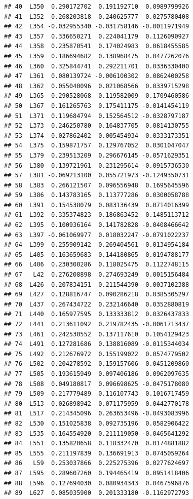 \documentclass[
]{article}
\begin{document}
\begin{verbatim}
## 40  L350  0.290172702  0.191192710  0.0989799926
## 41  L352  0.268203818  0.240625777  0.0275780408
## 42  L354 -0.032955340 -0.031758146 -0.0011971949
## 43  L357  0.336650271  0.224041179  0.1126090927
## 44  L358  0.235870541  0.174024983  0.0618455585
## 45  L359  0.186694682  0.138968475  0.0477262076
## 46  L360  0.325844741  0.292211701  0.0336330400
## 47  L361  0.080139724 -0.006100302  0.0862400258
## 48  L362  0.055040096  0.021068566  0.0339715298
## 49  L365  0.290528068  0.119582009  0.1709460586
## 50  L367  0.161265763  0.175411175 -0.0141454119
## 51  L371  0.119684794  0.152564512 -0.0328797187
## 52  L373  0.246250780  0.164837705  0.0814130755
## 53  L374 -0.027862402  0.005454934 -0.0333173351
## 54  L375  0.159871757  0.129767052  0.0301047047
## 55  L379  0.239513209  0.296676145 -0.0571629351
## 56  L380  0.139721961  0.231295614 -0.0915736530
## 57  L381 -0.069213100  0.055721973 -0.1249350731
## 58  L383  0.266121507  0.096556948  0.1695645596
## 59  L386  0.143783165  0.113777286  0.0300058788
## 60  L391  0.154538079  0.083136439  0.0714016399
## 61  L392  0.335374823  0.186863452  0.1485113712
## 62  L395  0.100936164  0.141782828 -0.0408466642
## 63  L397 -0.061069977  0.018032247 -0.0791022237
## 64  L399  0.255909142  0.269404561 -0.0134954184
## 65  L405  0.163659683  0.144180865  0.0194788177
## 66  L406  0.230300286  0.118025475  0.1122748115
## 67   L42  0.276208898  0.274693249  0.0015156484
## 68  L426  0.207834151  0.211544390 -0.0037102388
## 69  L427  0.128816747  0.090286218  0.0385305297
## 70  L437  0.267434722  0.232146640  0.0352880819
## 71  L440  0.165977595  0.133333812  0.0326437833
## 72  L441  0.213611092  0.219782435 -0.0061713437
## 73  L461  0.242530552  0.137117610  0.1054129423
## 74  L491  0.127281686  0.138816089 -0.0115344034
## 75  L492  0.212676972  0.155199022  0.0574779502
## 76  L502  0.204278592  0.159157606  0.0451209860
## 77  L505  0.193615949  0.097406186  0.0962097635
## 78  L508  0.049180817  0.096698625 -0.0475178080
## 79  L509  0.217779489  0.116107743  0.1016717459
## 80  L513 -0.026898942 -0.071175959  0.0442770178
## 81  L517  0.214345096  0.263653496 -0.0493083996
## 82  L530  0.151025838  0.092735196  0.0582906422
## 83  L535  0.164554920  0.211119050 -0.0465641292
## 84  L551  0.135820658  0.118332470  0.0174881882
## 85  L555  0.211197839  0.136691913  0.0745059264
## 86   L59  0.253037866  0.225275396  0.0277624697
## 87  L595  0.289607260  0.194465419  0.0951418406
## 88  L596  0.127694030  0.080934343  0.0467596876
## 89  L627  0.085035900  0.201333180 -0.1162972793

\end{verbatim}
\end{document}
